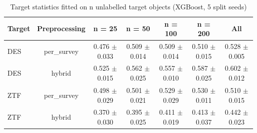 \begin{table}
\centering
\caption{Target statistics fitted on n unlabelled target objects (XGBoost, 5 split seeds)}
\begin{tabular}{lcccccc}
\hline
Target & Preprocessing & n = 25 & n = 50 & n = 100 & n = 200 & All \\
\hline
DES & per\_survey & 0.476 $\pm$ 0.033 & 0.509 $\pm$ 0.014 & 0.509 $\pm$ 0.014 & 0.510 $\pm$ 0.015 & 0.528 $\pm$ 0.005 \\
DES & hybrid & 0.525 $\pm$ 0.015 & 0.562 $\pm$ 0.025 & 0.557 $\pm$ 0.010 & 0.587 $\pm$ 0.025 & 0.602 $\pm$ 0.012 \\
ZTF & per\_survey & 0.498 $\pm$ 0.029 & 0.501 $\pm$ 0.021 & 0.529 $\pm$ 0.029 & 0.530 $\pm$ 0.011 & 0.510 $\pm$ 0.015 \\
ZTF & hybrid & 0.370 $\pm$ 0.030 & 0.395 $\pm$ 0.025 & 0.411 $\pm$ 0.019 & 0.413 $\pm$ 0.037 & 0.442 $\pm$ 0.023 \\
\hline
\end{tabular}
\end{table}
